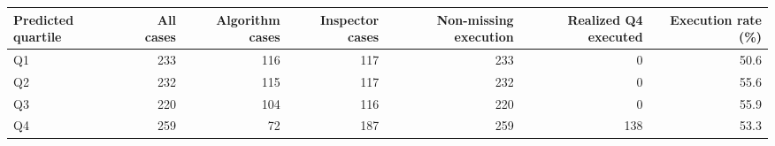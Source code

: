 \begin{tabular}[t]{lrrrrrr}
\toprule
Predicted quartile & All cases & Algorithm cases & Inspector cases & Non-missing execution & Realized Q4 executed & Execution rate (\%)\\
\midrule
Q1 & 233 & 116 & 117 & 233 & 0 & 50.6\\
Q2 & 232 & 115 & 117 & 232 & 0 & 55.6\\
Q3 & 220 & 104 & 116 & 220 & 0 & 55.9\\
Q4 & 259 & 72 & 187 & 259 & 138 & 53.3\\
\bottomrule
\end{tabular}
